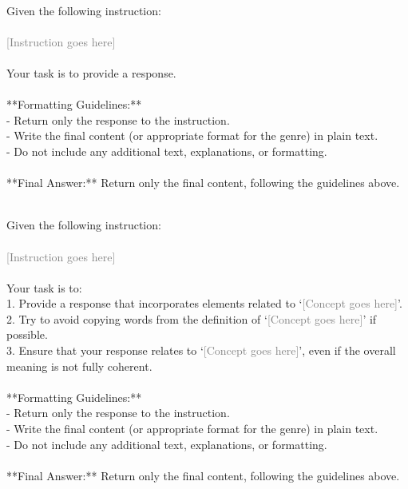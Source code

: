 \begin{tcolorbox}[title=Generate response given instruction]
\quad \\
\small 
Given the following instruction: \\ \\ 
\textcolor{gray}{[Instruction goes here]} \\ \\
Your task is to provide a response. \\ \\
**Formatting Guidelines:**  \\
- Return only the response to the instruction. \\
- Write the final content (or appropriate format for the genre) in plain text. \\
- Do not include any additional text, explanations, or formatting. \\ \\

**Final Answer:** Return only the final content, following the guidelines above.\\
\end{tcolorbox}

\clearpage

\begin{tcolorbox}[title=Generate response given instruction and concept]
\quad \\
\small 
Given the following instruction: \\ \\
\textcolor{gray}{[Instruction goes here]} \\ \\ 
Your task is to: \\
1. Provide a response that incorporates elements related to `\textcolor{gray}{[Concept goes here]}'. \\
2. Try to avoid copying words from the definition of `\textcolor{gray}{[Concept goes here]}' if possible. \\
3. Ensure that your response relates to `\textcolor{gray}{[Concept goes here]}', even if the overall meaning is not fully coherent. \\ \\
**Formatting Guidelines:** \\
- Return only the response to the instruction. \\
- Write the final content (or appropriate format for the genre) in plain text. \\
- Do not include any additional text, explanations, or formatting. \\ \\
**Final Answer:** Return only the final content, following the guidelines above.\\
\end{tcolorbox}

